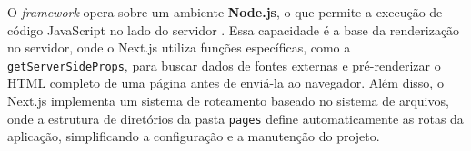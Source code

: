 O \emph{framework} opera sobre um ambiente \textbf{Node.js}, o que permite a execução de código JavaScript no lado do servidor \cite{nodejs2025}. Essa capacidade é a base da renderização no servidor, onde o Next.js utiliza funções específicas, como a \texttt{getServerSideProps}, para buscar dados de fontes externas e pré-renderizar o HTML completo de uma página antes de enviá-la ao navegador. Além disso, o Next.js implementa um sistema de roteamento baseado no sistema de arquivos, onde a estrutura de diretórios da pasta \texttt{pages} define automaticamente as rotas da aplicação, simplificando a configuração e a manutenção do projeto.